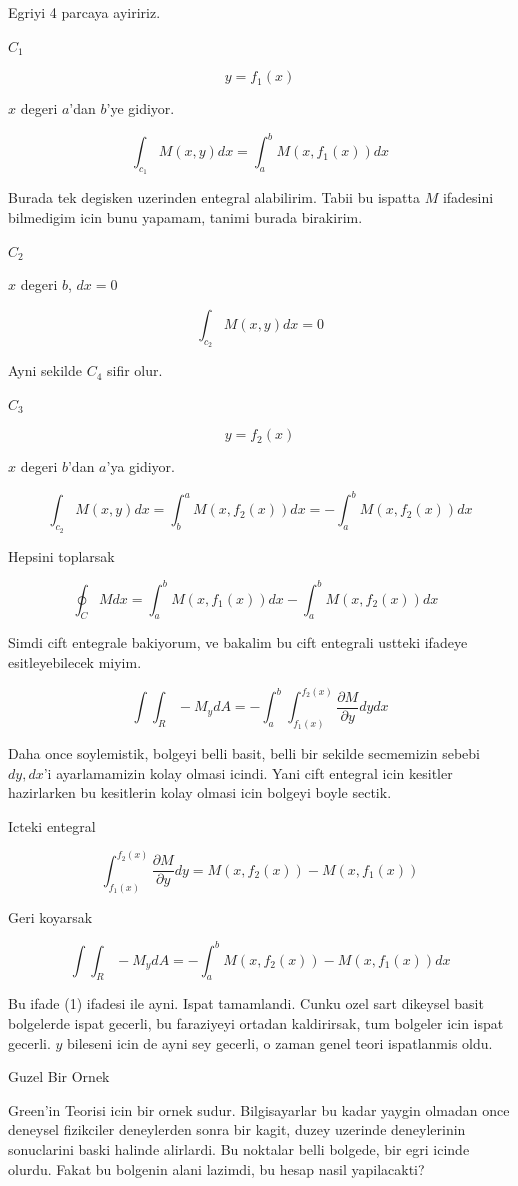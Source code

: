 \documentclass[12pt,fleqn]{article}\usepackage{../common}
\begin{document}
Egriyi 4 parcaya ayiririz. 

$C_1$

\[ y = f_1(x) \]

$x$ degeri $a$'dan $b$'ye gidiyor. 

\[ \int_{c_1}M(x,y) dx = \int_a^b M(x,f_1(x))  dx\]

Burada tek degisken uzerinden entegral alabilirim. Tabii bu ispatta $M$
ifadesini bilmedigim icin bunu yapamam, tanimi burada birakirim. 

$C_2$

$x$ degeri $b$, $dx = 0$

\[ \int_{c_2}M(x,y) dx = 0\]

Ayni sekilde $C_4$ sifir olur. 

$C_3$

\[ y = f_2(x) \]

$x$ degeri $b$'dan $a$'ya gidiyor. 

\[ \int_{c_2}M(x,y) dx = \int_b^a M(x,f_2(x)) dx = 
-  \int_a^b M(x,f_2(x)) dx 
\]

Hepsini toplarsak

\[ \oint_C M dx  =
\int_a^b M(x,f_1(x))  dx -
\int_a^b M(x,f_2(x)) dx  \  \  \ \label{1}
 \]

Simdi cift entegrale bakiyorum, ve bakalim bu cift entegrali ustteki
ifadeye esitleyebilecek miyim. 

\[ \int \int_R -M_y dA = 
- \int_a^b \int_{f_1(x)}^{f_2(x)} \frac{\partial M}{\partial y} dy dx \]

Daha once soylemistik, bolgeyi belli basit, belli bir sekilde secmemizin
sebebi $dy,dx$'i ayarlamamizin kolay olmasi icindi. Yani cift entegral icin
kesitler hazirlarken bu kesitlerin kolay olmasi icin bolgeyi boyle
sectik. 

Icteki entegral

\[ \int_{f_1(x)}^{f_2(x)} \frac{\partial M}{\partial y} dy =
M(x,f_2(x)) - M(x,f_1(x))
 \]

Geri koyarsak

\[ \int \int_R -M_y dA = 
- \int_a^b M(x,f_2(x)) - M(x,f_1(x)) dx \]

Bu ifade (1) ifadesi ile ayni. Ispat tamamlandi. Cunku ozel sart dikeysel
basit bolgelerde ispat gecerli, bu faraziyeyi ortadan kaldirirsak, tum
bolgeler icin ispat gecerli. $y$ bileseni icin de ayni sey gecerli, o zaman
genel teori ispatlanmis oldu.

Guzel Bir Ornek 

Green'in Teorisi icin bir ornek sudur. Bilgisayarlar bu kadar yaygin olmadan
once deneysel fizikciler deneylerden sonra bir kagit, duzey uzerinde
deneylerinin sonuclarini baski halinde alirlardi. Bu noktalar belli
bolgede, bir egri icinde olurdu. Fakat bu bolgenin alani lazimdi, bu hesap
nasil yapilacakti?
\end{document}
